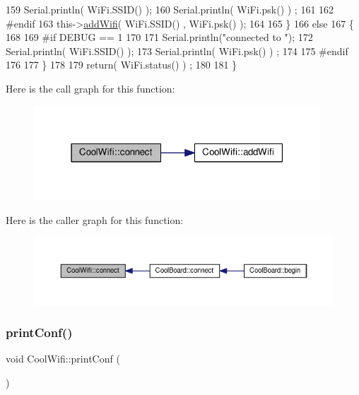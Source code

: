 \begin{DoxyCode}
159             Serial.println( WiFi.SSID() );
160             Serial.println( WiFi.psk() ) ;
161             
162 \textcolor{preprocessor}{        #endif}
163             this->\hyperlink{classCoolWifi_a914d7a1df14dd6b75345fb614c34e9d6}{addWifi}( WiFi.SSID() , WiFi.psk() );
164         
165     \}
166     \textcolor{keywordflow}{else}
167     \{
168 
169 \textcolor{preprocessor}{    #if DEBUG == 1}
170 
171         Serial.println(\textcolor{stringliteral}{"connected to "});
172         Serial.println( WiFi.SSID() );
173         Serial.println( WiFi.psk() ) ;
174                 
175 \textcolor{preprocessor}{    #endif}
176     
177     \}
178     
179     \textcolor{keywordflow}{return}( WiFi.status() ) ;
180 
181 \}
\end{DoxyCode}
Here is the call graph for this function\+:\nopagebreak
\begin{figure}[H]
\begin{center}
\leavevmode
\includegraphics[width=304pt]{classCoolWifi_ad060353050f40d032a2dbf9e54a768bf_cgraph}
\end{center}
\end{figure}
Here is the caller graph for this function\+:\nopagebreak
\begin{figure}[H]
\begin{center}
\leavevmode
\includegraphics[width=350pt]{classCoolWifi_ad060353050f40d032a2dbf9e54a768bf_icgraph}
\end{center}
\end{figure}
\mbox{\label{classCoolWifi_a9e6105c6d13d35ec510f6633da9e0223}} 
\subsubsection{\texorpdfstring{print\+Conf()}{printConf()}}
{\footnotesize\ttfamily void Cool\+Wifi\+::print\+Conf (\begin{DoxyParamCaption}{ }\end{DoxyParamCaption})}

